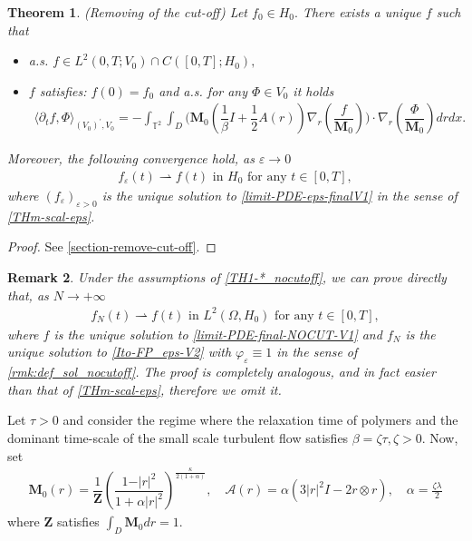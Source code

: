 \documentclass[a4paper,12pt, reqno]{amsart}
\newtheorem{theorem}{Theorem}
\newtheorem{remark}[theorem]{Remark}
\begin{document}
        \begin{theorem}\label{THm-eps-nocut}(Removing of the cut-off)
Let $f_0\in H_0.$        There exists  a unique $f$ such that
    \begin{itemize}
        \item a.s.  $f \in L^2(0, T;V_0) \cap C([0, T];H_0),$
        \item   $f$ satisfies:  $f(0)=f_0$ and a.s. for any $\Phi \in V_0$ it holds
        \begin{align}\label{limit-PDE-final-NOCUT-V1}
    \langle\partial_t f,\Phi\rangle_{(V_0)^\prime,V_0}=-\int_{\mathbb{T}^2}\int_D\bigl(\mathbf{M}_0 (\dfrac{1}{\beta}I+\dfrac{1}{2}A(r))\nabla_r(\dfrac{f}{\mathbf{M}_0})\bigr)\cdot \nabla_r\left(\dfrac{\Phi}{\mathbf{M}_0}\right) drdx.
\end{align}
    \end{itemize}
    Moreover, the following convergence hold, as $\varepsilon\to 0$
    \begin{align}\label{cv-eps-*V1}
        f_\varepsilon(t) \rightharpoonup f(t) \text{ in } H_0 \text{ for any } t\in [0,T],
    \end{align}
    where $(f_\varepsilon)_{\varepsilon>0}$ is the unique solution to  \eqref{limit-PDE-eps-finalV1} in the sense of \autoref{THm-scal-eps}.
    \end{theorem}
    \begin{proof}
        See \autoref{section-remove-cut-off}.
    \end{proof}
 {\begin{remark}
     Under the assumptions of  \autoref{TH1-*_nocutoff},  we can prove directly that, as  
  $N\to +\infty$    \begin{align}\label{cv-N--no-cut}
        f_N(t) \rightharpoonup f(t) \text{ in } L^2(\Omega,H_0) \text{ for any } t\in [0,T],
    \end{align}
    where $f$ is the unique solution to \eqref{limit-PDE-final-NOCUT-V1} and $f_N$ is the unique solution to  \eqref{Ito-FP_eps-V2} with $\varphi_\varepsilon\equiv 1$ in the sense of  \autoref{rmk:def_sol_nocutoff}. The proof is completely analogous, and in fact easier than that of \autoref{THm-scal-eps}, therefore we omit it. 
 \end{remark}}
  Let $\tau>0$    and consider the regime where the relaxation time of polymers and the dominant time-scale of the small scale turbulent flow satisfies $\beta=\zeta \tau, \zeta>0$. Now, set
  \begin{align}\label{limit-matrix-main}
   \mathbf{M}_0(r)=\dfrac{1}{\mathbf{Z}}\left(
\dfrac{1 - \vert r\vert^{2}}{1 + \alpha \vert r\vert^{2}}
\right)^{\frac{\kappa}{2\left(1 + \alpha \right)}}, \quad \mathcal{A}(r)= \alpha(3 \left\vert r\right\vert^2I-2r\otimes r),  \quad \alpha=\frac{\zeta\lambda}{2}
\end{align} where $\mathbf{Z}$ satisfies $\int_D \mathbf{M}_0 dr=1.$
\end{document}
